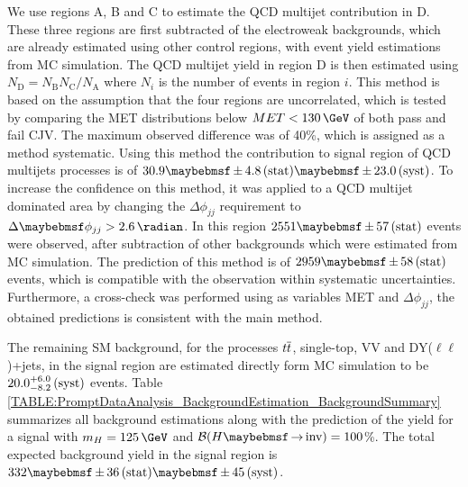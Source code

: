 We use regions A, B and C to estimate the \gls{QCD} multijet contribution in D. These three regions are first subtracted of the electroweak backgrounds, which are already estimated using other control regions, with event yield estimations from \gls{MC} simulation. The \gls{QCD} multijet yield in region D is then estimated using $N_\mathrm{D} = N_\mathrm{B}N_\mathrm{C} / N_\mathrm{A}$ where $N_{i}$ is the number of events in region $i$. This method is based on the assumption that the four regions are uncorrelated, which is tested by comparing the \gls{MET} distributions below $MET < 130\,\GeV$ of both pass and fail \gls{CJV}. The maximum observed difference was of 40\%, which is assigned as a method systematic. Using this method the contribution to signal region of \gls{QCD} multijets processes is of $30.9 \pm 4.8\stat \pm 23.0\syst$. To increase the confidence on this method, it was applied to a \gls{QCD} multijet dominated area by changing the $\Delta\phi_{jj}$ requirement to $\Delta\phi_{jj}>2.6\,\radian$. In this region $2551 \pm 57\stat$ events were observed, after subtraction of other backgrounds which were estimated from \gls{MC} simulation. The prediction of this method is of $2959 \pm 58\stat$ events, which is compatible with the observation within systematic uncertainties. Furthermore, a cross-check was performed using as variables \gls{MET} and $\Delta\phi_{jj}$, the obtained predictions is consistent with the main method.

The remaining \gls{SM} background, for the processes $t\overline{t}$, single-top, VV and DY($\ell\ell$)+jets, in the signal region are estimated  directly form \gls{MC} simulation to be $20.0 ^{+6.0}_{-8.2}\,\text{(syst)}$ events. Table \ref{TABLE:PromptDataAnalysis_BackgroundEstimation_BackgroundSummary} summarizes all background estimations along with the prediction of the yield for a signal with $m_{H}=125\,\GeV$ and $\BRinv=100$\%. The total expected background yield in the signal region is $332 \pm 36\stat \pm 45\syst$. 

